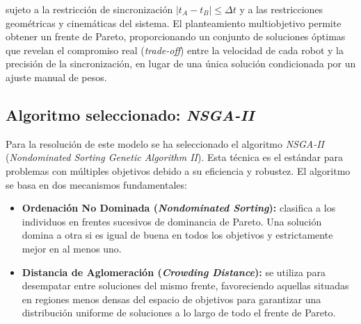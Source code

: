 sujeto a la restricción de sincronización $|t_A - t_B| \le \Delta t$ y a las restricciones 
geométricas y cinemáticas del sistema. El planteamiento multiobjetivo permite obtener 
un frente de Pareto, proporcionando un conjunto de soluciones óptimas que revelan el 
compromiso real (\textit{trade-off}) entre la velocidad de cada robot y la precisión de la 
sincronización, en lugar de una única solución condicionada por un ajuste manual de pesos.

\subsection*{Algoritmo seleccionado: \textit{NSGA-II}}
Para la resolución de este modelo se ha seleccionado el algoritmo \textit{NSGA-II} 
(\textit{Nondominated Sorting Genetic Algorithm II}). Esta técnica es el estándar para problemas 
con múltiples objetivos debido a su eficiencia y robustez. El algoritmo se basa en dos mecanismos 
fundamentales:
\begin{itemize}
    \item \textbf{Ordenación No Dominada (\textit{Nondominated Sorting}):} clasifica a los individuos en 
    frentes sucesivos de dominancia de Pareto. Una solución domina a otra si es igual de buena en 
    todos los objetivos y estrictamente mejor en al menos uno.
    \item \textbf{Distancia de Aglomeración (\textit{Crowding Distance}):} se utiliza para desempatar entre 
    soluciones del mismo frente, favoreciendo aquellas situadas en regiones menos densas del espacio
    de objetivos para garantizar una distribución uniforme de soluciones a lo largo de todo el frente
    de Pareto.
\end{itemize}

